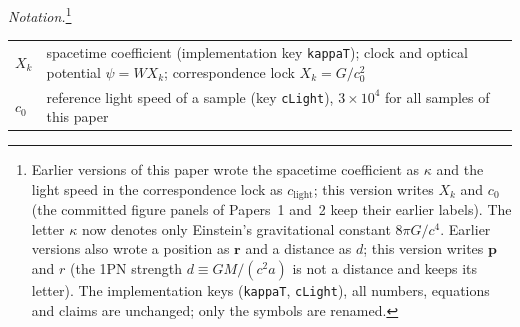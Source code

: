 \documentclass[aps,reprint,amsmath,amssymb,nofootinbib,superscriptaddress,floatfix]{revtex4-2}
\begin{document}
\begin{abstract}
five acceptance windows fixed in writing beforehand and scores
$2$~PASS~/~$3$~FAIL---W1 and W4 hold; W2, W3 and W5 fail---and all five
are reported here, with the post-specified analyses attached to two of
the failures kept in a separate column.
Applied without refitting to the Jovian system---one evaluation at Io's
orbit, so that Io carries the reference and Europa, Ganymede and
Callisto are held out, and no per-moon parameter exists---it keeps all
four Galilean moons within $0.051\%$ of their observed sidereal periods
over $20$ Io revolutions, whereas the $q=3$ control moves two of the
four outside the pre-registered $\pm1\%$; those periods are transcribed
rather than predicted, and the outcome is unchanged across the whole
strongly attenuated family $q\gtrsim8$ (measured to be insensitive over
$q=8$--$14$), so the run is a \emph{stress test} that separates $q=3$
from that saturated high-$q$ class rather than a verification of the
closed form, and what survives it is the class rather than the
particular value the rule returns.
A source-dependence variant confirms that this conclusion does not
depend on which tabulation of the Galilean periods is adopted.
The failures that produced the conventions are reported as results, and
a calibrated match is not claimed to license more than it does:
agreement of a number is not identification of a mechanism.
\end{abstract}

\maketitle

\noindent\textit{Notation.}\footnote{Earlier versions of this paper wrote the spacetime coefficient as $\kappa$ and the light speed in the correspondence lock as $c_{\mathrm{light}}$; this version writes $X_k$ and $c_0$ (the committed figure panels of Papers~1 and~2 keep their earlier labels). The letter $\kappa$ now denotes only Einstein's gravitational constant $8\pi G/c^{4}$. Earlier versions also wrote a position as $\bm r$ and a distance as $d$; this version writes $\bm p$ and $r$ (the 1PN strength $d\equiv GM/(c^{2}a)$ is not a distance and keeps its letter). The implementation keys (\texttt{kappaT}, \texttt{cLight}), all numbers, equations and claims are unchanged; only the symbols are renamed.}
\begin{center}
\small
\begin{tabular}{@{}lp{}@{}}
\hline
$X_k$ & spacetime coefficient (implementation key \texttt{kappaT}); clock and optical potential $\psi = W X_k$; correspondence lock $X_k = G/c_0^{2}$ \\
$c_0$ & reference light speed of a sample (key \texttt{cLight}), $3\times10^{4}$ for all samples of this paper \\
\hline
\end{tabular}
\end{center}
\end{document}
